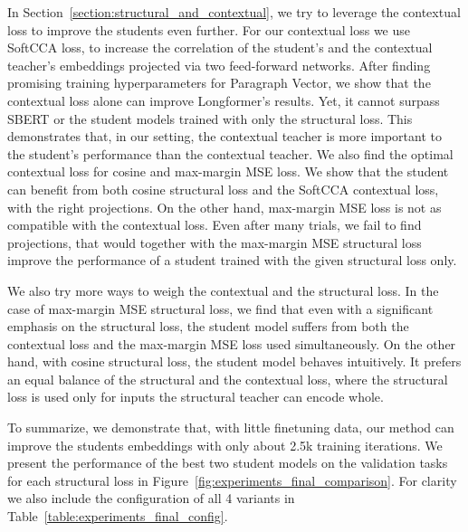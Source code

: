 
In Section~\ref{section:structural_and_contextual}, we try to leverage the
contextual loss to improve the students even further. For our contextual loss
we use SoftCCA loss, to increase the correlation of the student's and the
contextual teacher's embeddings projected via two feed-forward networks. After
finding promising training hyperparameters for Paragraph Vector, we show that
the contextual loss alone can improve Longformer's results. Yet, it cannot
surpass SBERT or the student models trained with only the structural loss. This
demonstrates that, in our setting, the contextual teacher is more important to
the student's performance than the contextual teacher. We also find the optimal
contextual loss for cosine and max-margin MSE loss. We show that the student
can benefit from both cosine structural loss and the SoftCCA contextual loss,
with the right projections. On the other hand, max-margin MSE loss is not as
compatible with the contextual loss. Even after many trials, we fail to find
projections, that would together with the max-margin MSE structural loss
improve the performance of a student trained with the given structural loss
only.

We also try more ways to weigh the contextual and the structural loss. In the
case of max-margin MSE structural loss, we find that even with a significant
emphasis on the structural loss, the student model suffers from both the
contextual loss and the max-margin MSE loss used simultaneously. On the other
hand, with cosine structural loss, the student model behaves intuitively. It
prefers an equal balance of the structural and the contextual loss, where the
structural loss is used only for inputs the structural teacher can encode
whole.

To summarize, we demonstrate that, with little finetuning data, our method can
improve the students embeddings with only about 2.5k training iterations. We
present the performance of the best two student models on the validation tasks
for each structural loss in Figure~\ref{fig:experiments_final_comparison}. For
clarity we also include the configuration of all 4 variants in
Table~\ref{table:experiments_final_config}.

